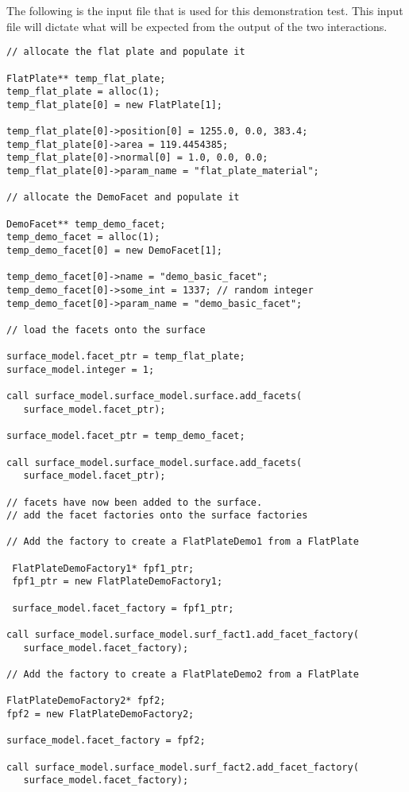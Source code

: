 \begin{description}
The following is the input file that is used for this demonstration
test. This input file will dictate what will be expected from the output
of the two interactions.

\begin{verbatim}
// allocate the flat plate and populate it

FlatPlate** temp_flat_plate;
temp_flat_plate = alloc(1);
temp_flat_plate[0] = new FlatPlate[1];

temp_flat_plate[0]->position[0] = 1255.0, 0.0, 383.4;
temp_flat_plate[0]->area = 119.4454385;
temp_flat_plate[0]->normal[0] = 1.0, 0.0, 0.0;
temp_flat_plate[0]->param_name = "flat_plate_material";

// allocate the DemoFacet and populate it

DemoFacet** temp_demo_facet;
temp_demo_facet = alloc(1);
temp_demo_facet[0] = new DemoFacet[1];

temp_demo_facet[0]->name = "demo_basic_facet";
temp_demo_facet[0]->some_int = 1337; // random integer
temp_demo_facet[0]->param_name = "demo_basic_facet";

// load the facets onto the surface

surface_model.facet_ptr = temp_flat_plate;
surface_model.integer = 1;

call surface_model.surface_model.surface.add_facets(
   surface_model.facet_ptr);

surface_model.facet_ptr = temp_demo_facet;

call surface_model.surface_model.surface.add_facets(
   surface_model.facet_ptr);

// facets have now been added to the surface.
// add the facet factories onto the surface factories

// Add the factory to create a FlatPlateDemo1 from a FlatPlate

 FlatPlateDemoFactory1* fpf1_ptr;
 fpf1_ptr = new FlatPlateDemoFactory1;

 surface_model.facet_factory = fpf1_ptr;

call surface_model.surface_model.surf_fact1.add_facet_factory(
   surface_model.facet_factory);

// Add the factory to create a FlatPlateDemo2 from a FlatPlate

FlatPlateDemoFactory2* fpf2;
fpf2 = new FlatPlateDemoFactory2;

surface_model.facet_factory = fpf2;

call surface_model.surface_model.surf_fact2.add_facet_factory(
   surface_model.facet_factory);


\end{verbatim}
\end{description}
